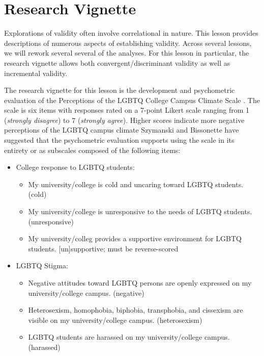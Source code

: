 \documentclass[
  english,
]{book}
\providecommand{\tightlist}{%
  \setlength{\itemsep}{0pt}\setlength{\parskip}{0pt}}
\begin{document}
\hypertarget{research-vignette-1}{%
\section{Research Vignette}\label{research-vignette-1}}

Explorations of validity often involve correlational in nature. This lesson provides descriptions of numerous aspects of establishing validity. Across several lessons, we will rework several several of the analyses. For this lesson in particular, the research vignette allows both convergent/discriminant validity as well as incremental validity.

The research vignette for this lesson is the development and psychometric evaluation of the Perceptions of the LGBTQ College Campus Climate Scale \citeyearpar{szymanski_perceptions_2020}. The scale is six items with responses rated on a 7-point Likert scale ranging from 1 (\emph{strongly disagree}) to 7 (\emph{strongly agree}). Higher scores indicate more negative perceptions of the LGBTQ campus climate Szymanski and Bissonette have suggested that the psychometric evaluation supports using the scale in its entirety or as subscales composed of the following items:

\begin{itemize}
\tightlist
\item
  College response to LGBTQ students:

  \begin{itemize}
  \tightlist
  \item
    My university/college is cold and uncaring toward LGBTQ students. (cold)
  \item
    My university/college is unresponsive to the needs of LGBTQ students. (unresponsive)
  \item
    My university/colleg provides a supportive environment for LGBTQ students. {[}un{]}supportive; must be reverse-scored
  \end{itemize}
\item
  LGBTQ Stigma:

  \begin{itemize}
  \tightlist
  \item
    Negative attitudes toward LGBTQ persons are openly expressed on my university/college campus. (negative)
  \item
    Heterosexism, homophobia, biphobia, transphobia, and cissexism are visible on my university/college campus. (heterosexism)
  \item
    LGBTQ students are harassed on my university/college campus. (harassed)
  \end{itemize}
\end{itemize}
\end{document}
